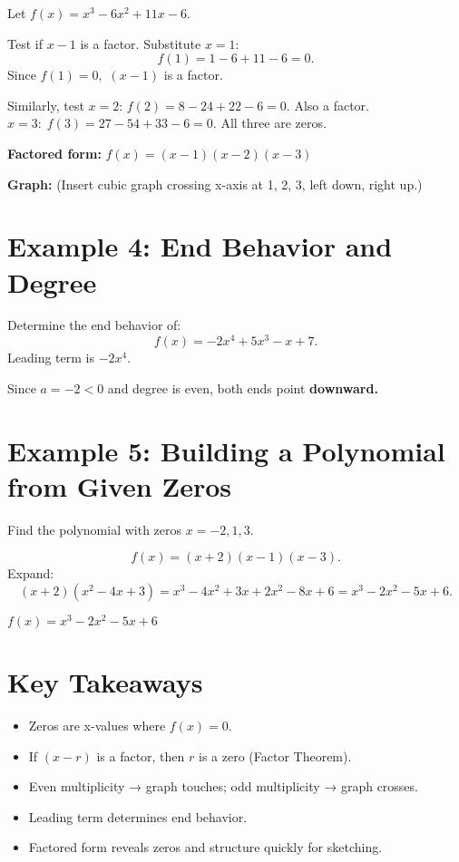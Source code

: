 \documentclass[12pt]{article}
\begin{document}
Let \(f(x) = x^3 - 6x^2 + 11x - 6.\)

Test if \(x - 1\) is a factor. Substitute \(x = 1\):
\[
f(1) = 1 - 6 + 11 - 6 = 0.
\]
Since \(f(1) = 0,\) \((x - 1)\) is a factor.

Similarly, test \(x = 2\):  
\(f(2) = 8 - 24 + 22 - 6 = 0.\)
Also a factor.  
\(x = 3:\; f(3) = 27 - 54 + 33 - 6 = 0.\)
All three are zeros.

\textbf{Factored form:} \(\boxed{f(x) = (x - 1)(x - 2)(x - 3)}\)

\textbf{Graph:} (Insert cubic graph crossing x-axis at 1, 2, 3, left down, right up.)

\section*{Example 4: End Behavior and Degree}

Determine the end behavior of:
\[
f(x) = -2x^4 + 5x^3 - x + 7.
\]
Leading term is \(-2x^4.\)

Since \(a = -2 < 0\) and degree is even,  
both ends point \textbf{downward.}

\section*{Example 5: Building a Polynomial from Given Zeros}

Find the polynomial with zeros \(x = -2, 1, 3.\)

\[
f(x) = (x + 2)(x - 1)(x - 3).
\]
Expand:
\[
(x + 2)(x^2 - 4x + 3) = x^3 - 4x^2 + 3x + 2x^2 - 8x + 6 = x^3 - 2x^2 - 5x + 6.
\]

\(\boxed{f(x) = x^3 - 2x^2 - 5x + 6}\)

\section*{Key Takeaways}
\begin{itemize}
  \item Zeros are x-values where \(f(x) = 0.\)
  \item If \((x - r)\) is a factor, then \(r\) is a zero (Factor Theorem).
  \item Even multiplicity → graph touches; odd multiplicity → graph crosses.
  \item Leading term determines end behavior.
  \item Factored form reveals zeros and structure quickly for sketching.
\end{itemize}
\end{document}
